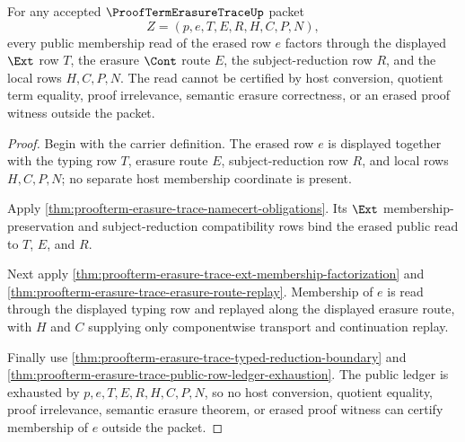 \begin{theorem}
\label{thm:proofterm-erasure-trace-erasure-membership-lock}
For any accepted $\ProofTermErasureTraceUp$ packet
$$
Z=(p,e,T,E,R,H,C,P,N),
$$
every public membership read of the erased row $e$ factors through the
displayed $\Ext$ row $T$, the erasure $\Cont$ route $E$, the
subject-reduction row $R$, and the local rows $H,C,P,N$. The read cannot be
certified by host conversion, quotient term equality, proof irrelevance,
semantic erasure correctness, or an erased proof witness outside the packet.
\end{theorem}
\begin{proof}
Begin with the carrier definition. The erased row $e$ is displayed together
with the typing row $T$, erasure route $E$, subject-reduction row $R$, and
local rows $H,C,P,N$; no separate host membership coordinate is present.

Apply \autoref{thm:proofterm-erasure-trace-namecert-obligations}. Its
$\Ext$ membership-preservation and subject-reduction compatibility rows bind
the erased public read to $T$, $E$, and $R$.

Next apply
\autoref{thm:proofterm-erasure-trace-ext-membership-factorization} and
\autoref{thm:proofterm-erasure-trace-erasure-route-replay}. Membership of $e$
is read through the displayed typing row and replayed along the displayed
erasure route, with $H$ and $C$ supplying only componentwise transport and
continuation replay.

Finally use
\autoref{thm:proofterm-erasure-trace-typed-reduction-boundary} and
\autoref{thm:proofterm-erasure-trace-public-row-ledger-exhaustion}. The
public ledger is exhausted by $p,e,T,E,R,H,C,P,N$, so no host conversion,
quotient equality, proof irrelevance, semantic erasure theorem, or erased
proof witness can certify membership of $e$ outside the packet.
\end{proof}

